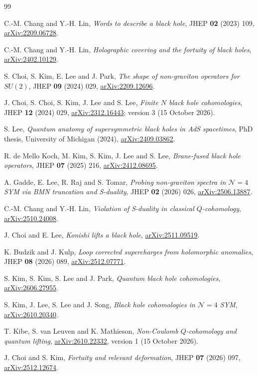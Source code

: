 \documentclass[11pt]{article}
\newcommand{\cN}{\mathcal{N}}
\newcommand{\arxiv}[1]{\href{https://arxiv.org/abs/#1}{arXiv:#1}}
\begin{document}
\begin{thebibliography}{99}\small

 C.-M. Chang and Y.-H. Lin, \emph{Words to describe a black hole}, JHEP \textbf{02} (2023) 109,
\arxiv{2209.06728}.

 C.-M. Chang and Y.-H. Lin, \emph{Holographic covering and the fortuity of black holes},
\arxiv{2402.10129}.

 S. Choi, S. Kim, E. Lee and J. Park, \emph{The shape of non-graviton operators for $SU(2)$},
JHEP \textbf{09} (2024) 029, \arxiv{2209.12696}.

 J. Choi, S. Choi, S. Kim, J. Lee and S. Lee, \emph{Finite $N$ black hole cohomologies},
JHEP \textbf{12} (2024) 029, \arxiv{2312.16443}; version 3 (15 October 2026).

 S. Lee, \emph{Quantum anatomy of supersymmetric black holes in AdS spacetimes}, PhD thesis,
University of Michigan (2024), \arxiv{2409.03862}.

 R. de Mello Koch, M. Kim, S. Kim, J. Lee and S. Lee, \emph{Brane-fused black hole operators},
JHEP \textbf{07} (2025) 216, \arxiv{2412.08695}.

 A. Gadde, E. Lee, R. Raj and S. Tomar, \emph{Probing non-graviton spectra in $\cN=4$ SYM via BMN
truncation and S-duality}, JHEP \textbf{02} (2026) 026, \arxiv{2506.13887}.

 C.-M. Chang and Y.-H. Lin, \emph{Violation of S-duality in classical $Q$-cohomology},
\arxiv{2510.24008}.

 J. Choi and E. Lee, \emph{Konishi lifts a black hole}, \arxiv{2511.09519}.

 K. Budzik and J. Kulp, \emph{Loop corrected supercharges from holomorphic anomalies},
JHEP \textbf{08} (2026) 089, \arxiv{2512.07771}.

 S. Kim, S. Kim, S. Lee and J. Park, \emph{Quantum black hole cohomologies}, \arxiv{2606.27955}.

 S. Kim, J. Lee, S. Lee and J. Song, \emph{Black hole cohomologies in $\cN=4$ SYM},
\arxiv{2610.20340}.

 T. Kibe, S. van Leuven and K. Mathieson, \emph{Non-Coulomb $Q$-cohomology and quantum lifting},
\arxiv{2610.22332}, version 1 (15 October 2026).

 J. Choi and S. Kim, \emph{Fortuity and relevant deformation}, JHEP \textbf{07} (2026) 097,
\arxiv{2512.12674}.


\end{thebibliography}
\end{document}
